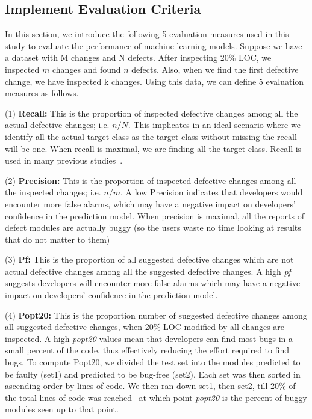 \documentclass[10pt,journal,compsoc]{IEEEtran}
\newcommand{\respto}[1]{
\fcolorbox{black}{black!15}{%
\label{resp:#1}%
\bf\scriptsize R{#1}}}
\begin{document}
\subsection{Implement Evaluation Criteria}
\label{sec:Measures}

In this section, we introduce the following 5 evaluation measures used in this study to evaluate the performance of machine learning models. Suppose we have a dataset with M changes and N defects. After inspecting 20\% LOC, we inspected $m$ changes and found $n$ defects. Also, when we find the first defective change, we have inspected k changes. Using
this data, we can define 5 evaluation measures  as follows.


{\color{blue}\respto{1-5f} 
(1) \textbf{Recall:} This is the proportion of inspected defective changes among all the actual defective changes; i.e. $n/N$. This implicates in an ideal scenario where we identify all the actual target class as the target class without missing the recall will be one. When recall is maximal, we are finding all  the target class. Recall is used in  many previous studies~\cite{kamei2012large,yang2016effort,yang2017tlel,xia2016collective,yang2015deep}.  

(2) \textbf{Precision:} This is the proportion of inspected defective changes among all the inspected changes; i.e. $n/m$. A low Precision indicates that developers would encounter more false alarms, which may have a negative impact on developers' confidence in the prediction model. When precision is maximal, all the reports of defect modules are actually buggy (so the users waste no time looking at results that do not matter to them)

(3) \textbf{Pf:} This is the proportion of all suggested defective changes which are not actual defective changes among all the suggested defective changes. A high {\em pf} suggests developers will encounter more false alarms which may have a negative impact on developers' confidence in the prediction model.

(4) \textbf{Popt20:} This is the proportion number of suggested defective changes among all suggested defective changes, when 20\% LOC modified by all changes are inspected. A high {\em popt20} values mean that developers can find most bugs in a small percent of the code, thus effectively reducing the effort required to find bugs. To compute Popt20, we divided the test set into the modules predicted to be faulty (set1) and predicted to be bug-free (set2). Each set was then sorted in ascending order by lines of code.  We then ran down set1, then set2, till 20\% of the total lines of code was reached-- at which point {\em popt20} is the percent of buggy modules seen up to that point.

}
\end{document}
